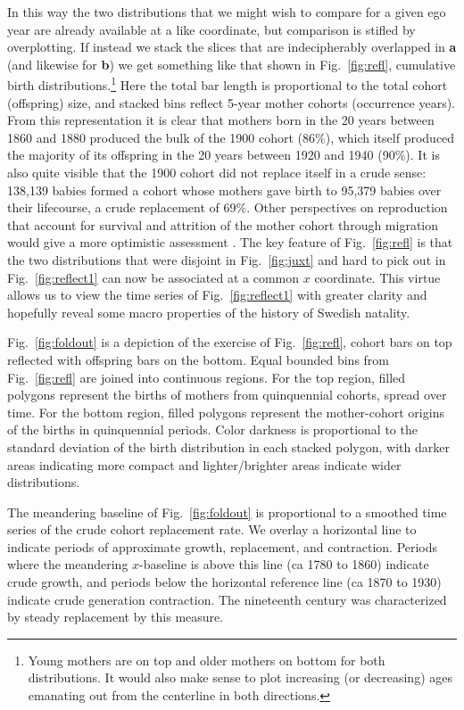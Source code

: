 \documentclass{article}
\begin{document}
In this way the two distributions that we might wish to compare for a given ego year are already available at a like coordinate, but comparison is stifled by overplotting. If instead we stack the slices that are indecipherably overlapped in \textbf{a} (and likewise for \textbf{b}) we get something like that shown in Fig.~\ref{fig:refl}, cumulative birth distributions.\footnote{Young mothers are on top and older mothers on bottom for both distributions. It would also make sense to plot increasing (or decreasing) ages emanating out from the centerline in both directions.} Here the total bar length is proportional to the total cohort (offspring) size, and stacked bins reflect 5-year mother cohorts (occurrence years). From this representation it is clear that mothers born in the 20 years between 1860 and 1880 produced the bulk of the 1900 cohort (86\%), which itself produced the majority of its offspring in the 20 years between 1920 and 1940 (90\%). It is also quite visible that the 1900 cohort did not replace itself in a crude sense: 138,139 babies formed a cohort whose mothers gave birth to 95,379 babies over their lifecourse, a crude replacement of 69\%. Other perspectives on reproduction that account for survival and attrition of the mother cohort through migration would give a more optimistic assessment \citep{henry1965reflexions}. The key feature of Fig.~\ref{fig:refl} is that the two distributions that were disjoint in Fig.~\ref{fig:juxt} and hard to pick out in Fig.~\ref{fig:reflect1} can now be associated at a common $x$ coordinate. This virtue allows us to view the time series of Fig.~\ref{fig:reflect1} with greater clarity and hopefully reveal some macro properties of the history of Swedish natality.

Fig.~\ref{fig:foldout} is a depiction of the exercise of Fig.~\ref{fig:refl}, cohort bars on top reflected with offspring bars on the bottom. Equal bounded bins from Fig.~\ref{fig:refl} are joined into continuous regions. For the top region, filled polygons represent the births of mothers from quinquennial cohorts, spread over time. For the bottom region, filled polygons represent the mother-cohort origins of the births in quinquennial periods. Color darkness is proportional to the standard deviation of the birth distribution in each stacked polygon, with darker areas indicating more compact and lighter/brighter areas indicate wider distributions. 

The meandering baseline of Fig.~\ref{fig:foldout} is proportional to a smoothed time series of the crude cohort replacement rate. We overlay a horizontal line to indicate periods of approximate growth, replacement, and contraction. Periods where the meandering $x$-baseline is above this line (ca 1780 to 1860) indicate crude growth, and periods below the horizontal reference line (ca 1870 to 1930) indicate crude generation contraction. The nineteenth century was characterized by steady replacement by this measure.
\end{document}

